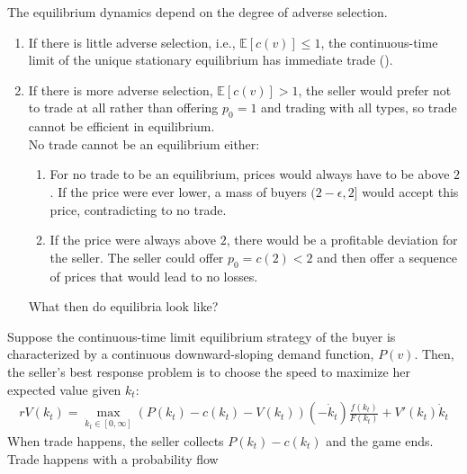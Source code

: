 \documentclass[11pt]{elegantbook}
\begin{document}
The equilibrium dynamics depend on the degree of adverse selection.
\begin{enumerate}
    \item If there is little adverse selection, i.e., $\mathbb{E}[c(v)]\leq 1$, the continuous-time limit of the unique stationary equilibrium has immediate trade (\cite{deneckere2006bargaining}).
    \item If there is more adverse selection, $\mathbb{E}[c(v)]>1$, the seller would prefer not to trade at all rather than offering $p_0=1$ and trading with all types, so trade cannot be efficient in equilibrium.\\
    No trade cannot be an equilibrium either:
    \begin{enumerate}
        \item For no trade to be an equilibrium, prices would always have to be above $2$. If the price were ever lower, a mass of buyers $(2-\epsilon,2]$ would accept this price, contradicting to no trade.
        \item If the price were always above $2$, there would be a profitable deviation for the seller. The seller could offer $p_0 = c(2) < 2$ and then offer a sequence of prices that would lead to no losses.
    \end{enumerate}
    What then do equilibria look like?
\end{enumerate}
Suppose the continuous-time limit equilibrium strategy of the buyer is characterized by a continuous downward-sloping demand function, $P(v)$. Then, the seller's best response problem is to choose the speed to maximize her expected value given $k_t$:
\begin{equation}
    \begin{aligned}
        r V(k_t) = \max_{\dot{k}_t\in[0,\infty]}\left(P(k_t)-c(k_t)-V(k_t)\right)(-\dot{k}_t)\frac{f(k_t)}{F(k_t)}+V'(k_t)\dot{k}_t
    \end{aligned}
    \nonumber
\end{equation}
When trade happens, the seller collects $P(k_t)-c(k_t)$ and the game ends. Trade happens with a probability flow
\end{document}
